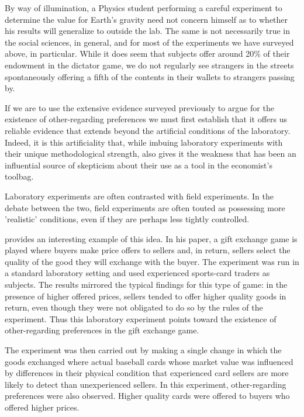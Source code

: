 \documentclass[12pt]{article}
\begin{document}
By way of illumination, a Physics student performing a careful experiment to determine the value for Earth's gravity need not concern himself as to whether his results will generalize to outside the lab. The same is not necessarily true in the social sciences, in general, and for most of the experiments we have surveyed above, in particular. While it does seem that subjects offer around 20\% of their endowment in the dictator game, we do not regularly see strangers in the streets spontaneously offering a fifth of the contents in their wallets to strangers passing by. 

If we are to use the extensive evidence surveyed previously to argue for the existence of other-regarding preferences we must first establish that it offers us reliable evidence that extends beyond the artificial conditions of the laboratory. Indeed, it is this artificiality that, while imbuing laboratory experiments with their unique methodological strength, also gives it the weakness that has been an influential source of skepticism about their use as a tool in the economist's toolbag.

Laboratory experiments are often contrasted with field experiments. In the debate between the two, field experiments are often touted as possessing more 'realistic' conditions,  even if they are perhaps less tightly controlled. 

\cite{List2006} provides an interesting example of this idea. In his paper, a gift exchange game is played where buyers make price offers to sellers and, in return, sellers select the quality of the good they will exchange with the buyer. The experiment was run in a standard laboratory setting and used experienced sports-card traders as subjects. The results mirrored the typical findings for this type of game: in the presence of higher offered prices, sellers tended to offer higher quality goods in return, even though they were not obligated to do so by the rules of the experiment. Thus this laboratory experiment points toward the existence of other-regarding preferences in the gift exchange game. 

The experiment was then carried out by making a single change in which the goods exchanged where actual baseball cards whose market value was influenced by differences in their physical condition that experienced card sellers are more likely to detect than unexperienced sellers. In this experiment, other-regarding preferences were also observed. Higher quality cards were offered to buyers who offered higher prices.
\end{document}
